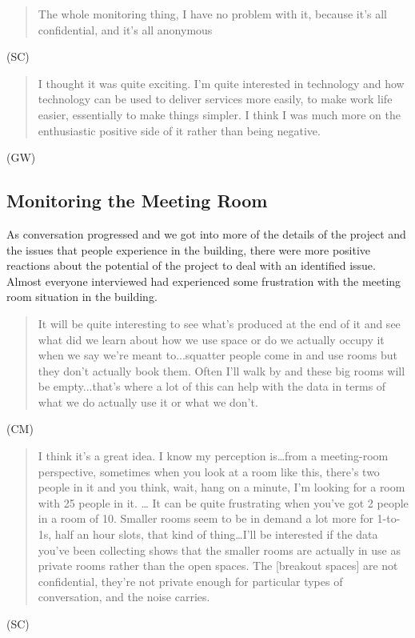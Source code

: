 \begin{quote}The whole monitoring thing, I have no problem with it, because it’s
all confidential, and it’s all anonymous\end{quote} (SC)

\begin{quote}I thought it was quite exciting. I’m quite interested in technology
and how technology can be used to deliver services more easily, to
make work life easier, essentially to make things simpler. I think I
was much more on the enthusiastic positive side of it rather than
being negative.\end{quote} (GW)

\subsection{Monitoring the Meeting Room}

As conversation progressed and we got into more of the details of the
project and the issues that people experience in the building, there
were more positive reactions about the potential of the project to
deal with an identified issue. Almost everyone interviewed had
experienced some frustration with the meeting room situation in the
building.

\begin{quote}It will be quite interesting to see what’s produced at the end of it
and see what did we learn about how we use space or do we actually
occupy it when we say we’re meant to...squatter people come in and use
rooms but they don’t actually book them. Often I’ll walk by and these
big rooms will be empty...that’s where a lot of this can help with the
data in terms of what we do actually use it or what we don’t.\end{quote} (CM)

\begin{quote}I think it’s a great idea. I know my perception is…from a
meeting-room perspective, sometimes when you look at a room like this,
there’s two people in it and you think, wait, hang on a minute, I’m
looking for a room with 25 people in it. … It can be quite frustrating
when you’ve got 2 people in a room of 10. Smaller rooms seem to be in
demand a lot more for 1-to-1s, half an hour slots, that kind of
thing…I’ll be interested if the data you’ve been collecting shows that
the smaller rooms are actually in use as private rooms rather than the
open spaces. The [breakout spaces] are not confidential, they’re not
private enough for particular types of conversation, and the noise
carries.\end{quote} (SC)

